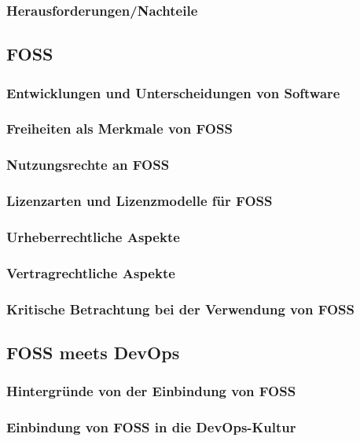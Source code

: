 \documentclass[12pt,titlepage]{article}
\begin{document}


\subsubsection{Herausforderungen/Nachteile}



\subsection{FOSS}



\subsubsection{Entwicklungen und Unterscheidungen von Software}
\subsubsection{Freiheiten als Merkmale von FOSS}
\subsubsection{Nutzungsrechte an FOSS}
\subsubsection{Lizenzarten und Lizenzmodelle für FOSS}
\subsubsection{Urheberrechtliche Aspekte}
\subsubsection{Vertragrechtliche Aspekte}
\subsubsection{Kritische Betrachtung bei der Verwendung von FOSS}

\subsection{FOSS meets DevOps}
\subsubsection{Hintergründe von der Einbindung von FOSS}
\subsubsection{Einbindung von FOSS in die DevOps-Kultur}
\end{document}
